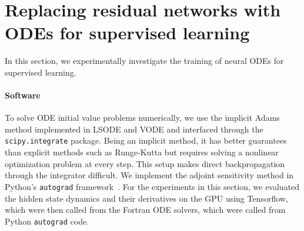 \documentclass{article}
\begin{document}
\section{Replacing residual networks with ODEs for supervised learning}
\label{sec:odenets}
In this section, we experimentally investigate the training of neural ODEs for supervised learning.

\paragraph{Software}
To solve ODE initial value problems numerically, we use the implicit Adams method implemented in LSODE and VODE and interfaced through the \texttt{scipy.integrate} package.
Being an implicit method, it has better guarantees than explicit methods such as Runge-Kutta but requires solving a nonlinear optimization problem at every step.
This setup makes direct backpropagation through the integrator difficult.
We implement the adjoint sensitivity method in Python's \texttt{autograd} framework~\citep{maclaurin2015autograd}.
For the experiments in this section, we evaluated the hidden state dynamics and their derivatives on the GPU using Tensorflow, which were then called from the Fortran ODE solvers, which were called from Python \texttt{autograd} code.
\end{document}
